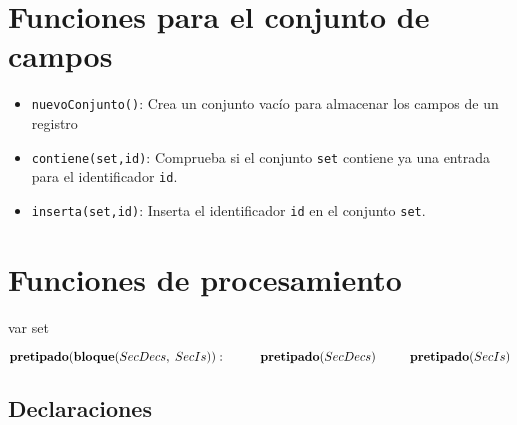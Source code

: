 \section{Funciones para el conjunto de campos}

\begin{itemize}
    \item \texttt{nuevoConjunto()}: Crea un conjunto vacío para almacenar los campos de un registro
    \item \texttt{contiene(set,id)}: Comprueba si el conjunto \texttt{set} contiene ya una entrada para el identificador \texttt{id}.
    \item \texttt{inserta(set,id)}: Inserta el identificador \texttt{id} en el conjunto \texttt{set}.
\end{itemize}

\section{Funciones de procesamiento}

var set

\begin{math}
    \textbf{pretipado}(\textbf{bloque}(SecDecs, \; SecIs)): \\
        \phantom{---} \textbf{pretipado}(SecDecs) \\
        \phantom{---} \textbf{pretipado}(SecIs)
\end{math}

\subsection{Declaraciones}

